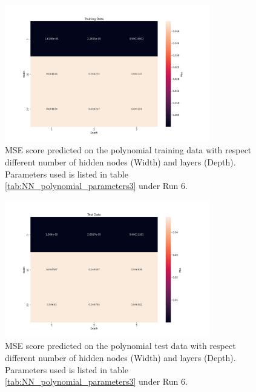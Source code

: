 \begin{figure}[H]
    \centering
    \includegraphics[width=0.8\textwidth]{Figures/PartB/heatmap_train_polydata_width_vs_depth.png}
    \caption{MSE score predicted on the polynomial training data with respect
    different number of hidden nodes (Width) and layers (Depth). Parameters
used is listed in table \ref{tab:NN_polynomial_parameters3} under Run 6.}  
    \label{fig:polydata_train_width_vs_depth} 

\end{figure}

\begin{figure}[H]
    \centering
    \includegraphics[width=0.8\textwidth]{Figures/PartB/heatmap_test_polydata_width_vs_depth.png}
    \caption{MSE score predicted on the polynomial test data with respect
    different number of hidden nodes (Width) and layers (Depth). Parameters
used is listed in table \ref{tab:NN_polynomial_parameters3} under Run 6.}  
    \label{fig:polydata_test_width_vs_depth} 
\end{figure}


